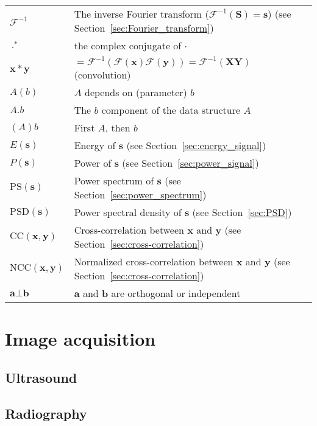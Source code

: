 \documentclass{report}%
\begin{document}
\begin{tabular}{ll}
  $\mathcal{F}^{-1}$ & The inverse Fourier transform ($\mathcal{F}^{-1}(\mathbf{S})=\mathbf{s}$)  (see Section~\ref{sec:Fourier_transform})\\
  $\cdot^*$ & the complex conjugate of $\cdot$ \\
  $\mathbf{x}*\mathbf{y}$ & $=\mathcal{F}^{-1}(\mathcal{F}(\mathbf{x})\mathcal{F}(\mathbf{y}))=\mathcal{F}^{-1}(\mathbf{X}\mathbf{Y})$ (convolution) \\
  $A(b)$ & $A$ depends on (parameter) $b$ \\
  $A.b$ & The $b$ component of the data structure $A$ \\
  $(A)b$ & First $A$, then $b$ \\
  $E(\mathbf{s})$ & Energy of $\mathbf{s}$ (see Section~\ref{sec:energy_signal}) \\
  $P(\mathbf{s})$ & Power of $\mathbf{s}$ (see Section~\ref{sec:power_signal}) \\
  $\text{PS}(\mathbf{s})$ & Power spectrum of $\mathbf{s}$ (see Section~\ref{sec:power_spectrum}) \\
  $\text{PSD}(\mathbf{s})$ & Power spectral density of $\mathbf{s}$ (see Section~\ref{sec:PSD}) \\
  $\text{CC}(\mathbf{x},\mathbf{y})$ & Cross-correlation between $\mathbf{x}$ and $\mathbf{y}$ (see Section~\ref{sec:cross-correlation}) \\
  $\text{NCC}(\mathbf{x},\mathbf{y})$ & Normalized cross-correlation between $\mathbf{x}$ and $\mathbf{y}$ (see Section~\ref{sec:cross-correlation}) \\
  $\mathbf{a}\bot \mathbf{b}$ & $\mathbf{a}$ and $\mathbf{b}$ are orthogonal or independent                                
\end{tabular}


\chapter{Image acquisition}


\section{Ultrasound}


\section{Radiography}

\end{document}
